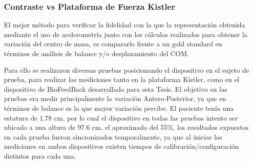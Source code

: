 \documentclass[12pt,a4paper]{article}
\begin{document}
\subsubsection{Contraste vs Plataforma de Fuerza Kistler}

El mejor método para verificar la fidelidad con la que la representación obtenida mediante el uso de acelerometría junto con los cálculos realizados para obtener la variación del centro de masa, es compararlo frente a un  gold standard en términos de análisis de balance y/o desplazamiento del COM.

Para ello se realizaron diversas pruebas posicionando el dispositivo en el sujeto de prueba, para realizar las mediciones tanto en la plataforma Kistler, como en el dispositivo de BioFeedBack desarrollado para esta Tesis.
El objetivo en las pruebas era medir principalmente la variación Antero-Posterior, ya que en términos de balance es la que mayor variación percibe.
El paciente tenía una estatura de 1.78 cm, por lo cual el dispositivo en todas las pruebas intento ser ubicado a una altura de 97.6 cm, el aproximado del 55\%, los resultados expuestos en cada prueba fueron sincronizados temporalmente, ya que al iniciar las mediciones en ambos dispositivos existen tiempos de calibración/configuración distintos para cada una.
\end{document}
